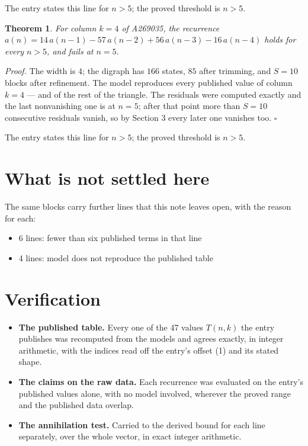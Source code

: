 \documentclass[11pt]{article}
\newtheorem{theorem}{Theorem}
\theoremstyle{definition}
\begin{document}
The entry states this line for $n > 5$; the proved threshold is $n > 5$.

\begin{theorem} For column $k = 4$ of A269035, the recurrence $a(n) = 14\,a(n-1) - 57\,a(n-2) + 56\,a(n-3) - 16\,a(n-4)$ holds for every $n > 5$, and fails at $n = 5$.\end{theorem}

{\itshape Proof.} The width is $4$; the digraph has $166$ states, $85$ after trimming, and $S = 10$ blocks after refinement. The model reproduces every published value of column $k = 4$ --- and of the rest of the triangle. The residuals were computed exactly and the last nonvanishing one is at $n = 5$; after that point more than $S = 10$ consecutive residuals vanish, so by Section 3 every later one vanishes too. $\square$

The entry states this line for $n > 5$; the proved threshold is $n > 5$.

\section{What is not settled here}

The same blocks carry further lines that this note leaves open, with the reason for each:

\begin{itemize}

\item 6 lines: fewer than six published terms in that line

\item 4 lines: model does not reproduce the published table

\end{itemize}

\section{Verification}

\begin{itemize}

\item {\bfseries The published table.} Every one of the 47 values $T(n,k)$ the entry publishes was recomputed from the models and agrees exactly, in integer arithmetic, with the indices read off the entry's offset (1) and its stated shape.

\item {\bfseries The claims on the raw data.} Each recurrence was evaluated on the entry's published values alone, with no model involved, wherever the proved range and the published data overlap.

\item {\bfseries The annihilation test.} Carried to the derived bound for each line separately, over the whole vector, in exact integer arithmetic.

\end{itemize}
\end{document}
